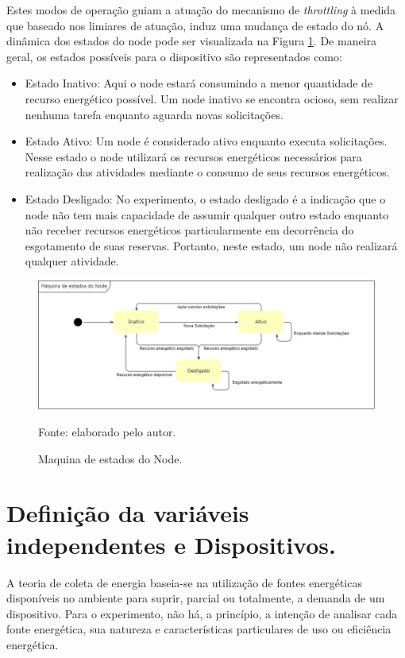 Estes modos de operação guiam a atuação do mecanismo de \textit{throttling} à medida que baseado nos limiares de atuação, induz uma mudança de estado do nó. A dinâmica dos estados do node pode ser visualizada na Figura \ref{fig:cap6maquinaestados}. De maneira geral, os estados possíveis para o dispositivo são representados como:

\begin{itemize}
	\item Estado Inativo: Aqui o node estará consumindo a menor quantidade de recurso energético possível. Um node inativo se encontra ocioso, sem realizar nenhuma tarefa enquanto aguarda novas solicitações.
	\item Estado Ativo: Um node é considerado ativo enquanto executa solicitações. Nesse estado o node utilizará os recursos energéticos necessários para realização  das atividades mediante o consumo de seus recursos energéticos. 
	\item Estado Desligado: No experimento, o estado desligado é a indicação que o node não tem mais capacidade de assumir qualquer outro estado enquanto não receber recursos energéticos particularmente em decorrência do esgotamento de suas reservas. Portanto, neste estado, um node não realizará qualquer atividade.	
	
\end{itemize}




\begin{figure}[H]
	\centering
	
	\caption{Maquina de estados do Node.}
	\label{fig:cap6maquinaestados}
	\noindent\includegraphics[width=0.75\linewidth]{Imagens/cap6/cap6maquinaestados.jpg} 
	
	Fonte: elaborado pelo autor.
\end{figure}


\section{Definição da variáveis independentes e Dispositivos.}

A teoria de coleta de energia baseia-se na utilização de fontes energéticas disponíveis no ambiente para suprir, parcial ou totalmente, a demanda de um dispositivo. Para o experimento, não há, a princípio, a intenção de analisar cada fonte energética, sua natureza e características particulares de uso ou eficiência energética. 

